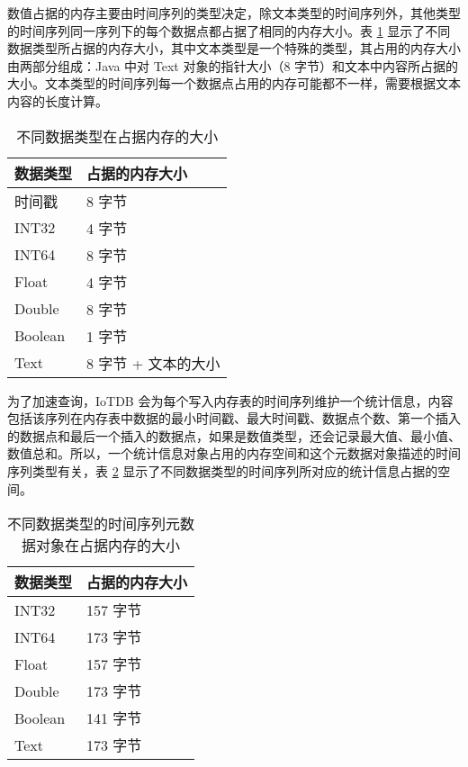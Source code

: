 数值占据的内存主要由时间序列的类型决定，除文本类型的时间序列外，其他类型的时间序列同一序列下的每个数据点都占据了相同的内存大小。表 \ref{tab:data-type-mem-size} 显示了不同数据类型所占据的内存大小，其中文本类型是一个特殊的类型，其占用的内存大小由两部分组成：Java 中对 Text 对象的指针大小（8 字节）和文本中内容所占据的大小。文本类型的时间序列每一个数据点占用的内存可能都不一样，需要根据文本内容的长度计算。
\begin{table}
  \centering
  \caption{不同数据类型在占据内存的大小}
  \begin{tabular}{ll}
    \toprule
    数据类型 & 占据的内存大小 \\
    \midrule
    时间戳 & 8 字节 \\
    INT32 & 4 字节 \\
    INT64 & 8 字节 \\
    Float & 4 字节 \\
    Double & 8 字节\\
    Boolean & 1 字节 \\
    Text & 8 字节 + 文本的大小 \\
    \bottomrule
  \end{tabular}
  \label{tab:data-type-mem-size}
\end{table}

为了加速查询，IoTDB 会为每个写入内存表的时间序列维护一个统计信息，内容包括该序列在内存表中数据的最小时间戳、最大时间戳、数据点个数、第一个插入的数据点和最后一个插入的数据点，如果是数值类型，还会记录最大值、最小值、数值总和。所以，一个统计信息对象占用的内存空间和这个元数据对象描述的时间序列类型有关，表 \ref{tab:data-type-statistic-mem-size} 显示了不同数据类型的时间序列所对应的统计信息占据的空间。

\begin{table}
  \centering
  \caption{不同数据类型的时间序列元数据对象在占据内存的大小}
  \begin{tabular}{ll}
    \toprule
    数据类型 & 占据的内存大小 \\
    \midrule
    INT32 & 157 字节 \\
    INT64 & 173 字节 \\
    Float & 157 字节 \\
    Double & 173 字节\\
    Boolean & 141 字节 \\
    Text & 173 字节 \\
    \bottomrule
  \end{tabular}
  \label{tab:data-type-statistic-mem-size}
\end{table}

